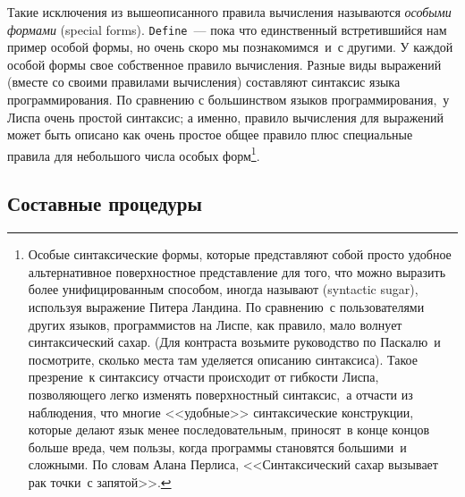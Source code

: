 Такие исключения из вышеописанного правила вычисления
называются {\em особыми формами} (special forms).
{\tt Define}~--- пока что единственный встретившийся нам
пример особой формы, но очень скоро мы познакомимся~и~с другими.
У каждой особой формы свое собственное правило вычисления.
Разные виды выражений (вместе со своими правилами вычисления)
составляют синтаксис языка программирования.  По сравнению с
большинством языков программирования,~у Лиспа очень простой синтаксис; 
а именно, правило вычисления для выражений может быть описано как
очень простое общее правило плюс специальные правила для небольшого числа
особых форм\footnote{Особые синтаксические формы, которые
представляют собой просто удобное альтернативное поверхностное
представление для того, что можно выразить более унифицированным
способом, иногда называют  (syntactic sugar), 
используя выражение Питера Ландина.
По сравнению~с пользователями других языков,
программистов на Лиспе, как правило, мало волнует синтаксический
сахар. (Для контраста возьмите руководство по Паскалю~и посмотрите, сколько места 
там уделяется описанию синтаксиса).  Такое презрение~к синтаксису
отчасти происходит от гибкости Лиспа, позволяющего легко изменять 
поверхностный синтаксис,~а отчасти из наблюдения, что многие
<<удобные>> синтаксические конструкции, которые делают язык менее
последовательным, приносят~в конце концов больше вреда, чем пользы,
когда программы становятся большими~и сложными. По словам Алана
Перлиса, <<Синтаксический сахар вызывает
рак точки~с запятой>>.
}.

\subsection{Составные процедуры}
\label{COMPOUND-PROCEDURES}


